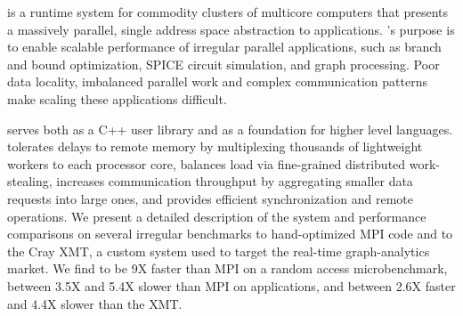 \Grappa is a runtime system for commodity clusters of multicore computers that
presents a massively parallel, single address space abstraction to
applications. \Grappa's purpose is to enable scalable performance of irregular
parallel applications, such as  branch and bound optimization, SPICE circuit simulation, and graph processing. Poor data locality,
imbalanced parallel work and complex communication patterns make scaling these
applications difficult.

\Grappa serves both as a C++ user library and as a foundation for higher level
languages. \Grappa tolerates delays to remote memory by multiplexing thousands
of lightweight workers to each processor core, balances load via fine-grained
distributed work-stealing, increases communication throughput by aggregating
smaller data requests into large ones, and provides efficient synchronization
and remote operations. We present a detailed description of the \Grappa system
and performance comparisons on several irregular benchmarks to hand-optimized
MPI code and to the Cray XMT, a custom system used to target the real-time
graph-analytics market. We find \Grappa to be 9X faster than MPI on a random access microbenchmark, between 3.5X and 5.4X slower than MPI on applications, and between 2.6X faster
and 4.4X slower than the XMT.
